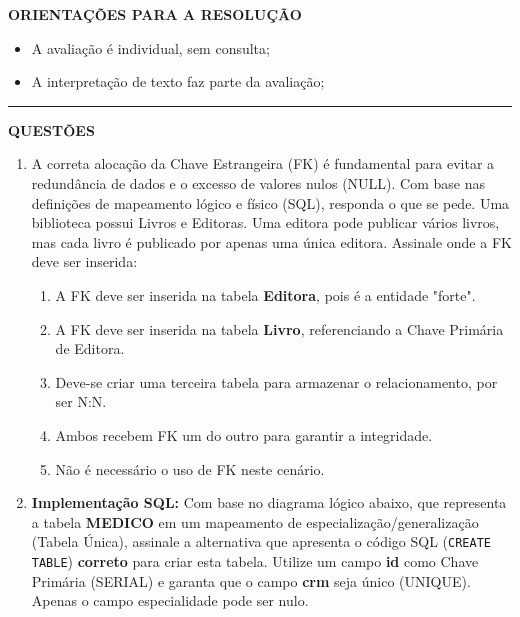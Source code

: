 \documentclass[12pt,a4paper]{article}
\begin{document}
\textbf{ORIENTAÇÕES PARA A RESOLUÇÃO}  

\begin{itemize}
    \item A avaliação é individual, sem consulta;
    \item A interpretação de texto faz parte da avaliação;
\end{itemize}

\vspace{0.5cm}

\begin{center}
    \rule{\textwidth}{0.4pt}
    \textbf{QUESTÕES}
\end{center}

\vspace{0.5cm} 

\begin{enumerate}
    \item A correta alocação da Chave Estrangeira (FK) é fundamental para evitar a redundância de dados e o excesso de valores nulos (NULL). Com base nas definições de mapeamento lógico e físico (SQL), responda o que se pede. Uma biblioteca possui Livros e Editoras. Uma editora pode publicar vários livros, mas cada livro é publicado por apenas uma única editora. Assinale onde a FK deve ser inserida:
    \begin{enumerate}[label=\Alph*)]
        \item A FK deve ser inserida na tabela \textbf{Editora}, pois é a entidade "forte".
        \item A FK deve ser inserida na tabela \textbf{Livro}, referenciando a Chave Primária de Editora.
        \item Deve-se criar uma terceira tabela para armazenar o relacionamento, por ser N:N.
        \item Ambos recebem FK um do outro para garantir a integridade.
        \item Não é necessário o uso de FK neste cenário.
    \end{enumerate}

    \item \textbf{Implementação SQL:} Com base no diagrama lógico abaixo, que representa a tabela \textbf{MEDICO} em um mapeamento de especialização/generalização (Tabela Única), assinale a alternativa que apresenta o código SQL (\texttt{CREATE TABLE}) \textbf{correto} para criar esta tabela. Utilize um campo \textbf{id} como Chave Primária (SERIAL) e garanta que o campo \textbf{crm} seja único (UNIQUE). Apenas o campo especialidade pode ser nulo.


\end{enumerate}
\end{document}
